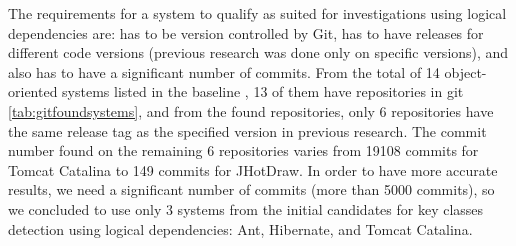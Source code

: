 \documentclass[runningheads]{comsis2}
\begin{document}
The requirements for a system to qualify as suited for investigations using logical dependencies are: has to be version controlled by Git, has to have releases for different code versions (previous research was done only on specific versions), and also has to have a significant number of commits. 
From the total of 14 object-oriented systems listed in the baseline \cite{Finding-key-classes}, 13 of them have repositories in git \ref{tab:gitfoundsystems}, and from the found repositories, only 6 repositories have the same release tag as the specified version in previous research.
The commit number found on the remaining 6 repositories varies from 19108 commits for Tomcat Catalina to 149 commits for JHotDraw. In order to have more accurate results, we need a significant number of commits (more than 5000 commits), so we concluded to use only 3 systems from the initial candidates for key classes detection using logical dependencies:  Ant, Hibernate, and Tomcat Catalina.  

\begin{table}
\renewcommand{\arraystretch}{1}
\caption{Systems and versions of the systems found in Git. }
\label{tab:gitfoundsystems}
\centering
{}
\end{table}
\end{document}
